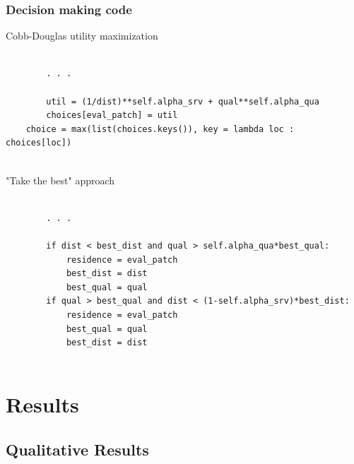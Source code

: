 \documentclass{beamer}
\newcommand\smallfont{\fontsize{8}{7.2}\selectfont}
\begin{document}
\begin{frame}[fragile] %
\frametitle{Decision making code}
\smallfont

\begin{block}{Cobb-Douglas utility maximization}
\begin{verbatim}

        . . .
        
        util = (1/dist)**self.alpha_srv + qual**self.alpha_qua
        choices[eval_patch] = util
    choice = max(list(choices.keys()), key = lambda loc : choices[loc])
    
\end{verbatim}
\end{block}

\begin{block}{"Take the best" approach}
\begin{verbatim}

        . . .
        
        if dist < best_dist and qual > self.alpha_qua*best_qual:
            residence = eval_patch
            best_dist = dist
            best_qual = qual
        if qual > best_qual and dist < (1-self.alpha_srv)*best_dist:
            residence = eval_patch
            best_qual = qual
            best_dist = dist
            
\end{verbatim}
\end{block}

\end{frame}

\section{Results}

\subsection{Qualitative Results}

\end{document}
